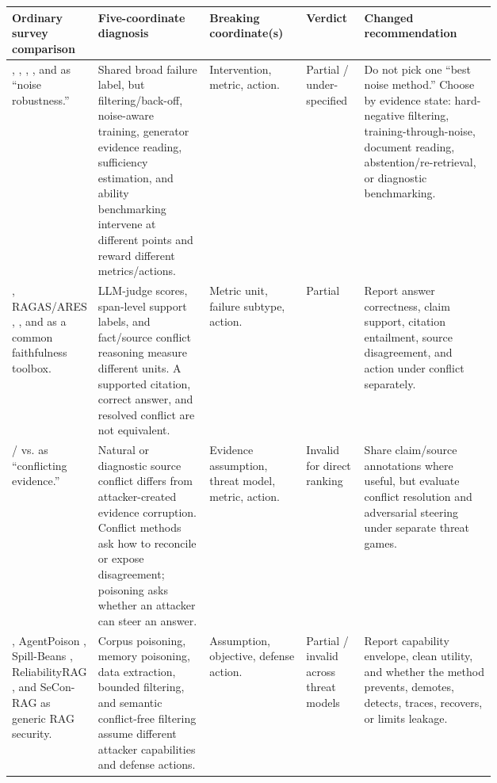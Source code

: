 \documentclass[11pt]{article}
\begin{document}


\begin{table}[t]
\centering
\tiny
\renewcommand{\arraystretch}{0.88}
\begin{tabularx}{\linewidth}{>{\raggedright\arraybackslash}p{0.16\linewidth}>{\raggedright\arraybackslash}p{0.23\linewidth}>{\raggedright\arraybackslash}p{0.20\linewidth}>{\raggedright\arraybackslash}p{0.12\linewidth}X}
\toprule
\textbf{Ordinary survey comparison} & \textbf{Five-coordinate diagnosis} & \textbf{Breaking coordinate(s)} & \textbf{Verdict} & \textbf{Changed recommendation} \\
\midrule
\citet{irrelevantContext2023}, \citet{raat2024}, \citet{chainOfNote2023}, \citet{sufficientContext2024}, and \citet{rgb2023} as ``noise robustness.'' & Shared broad failure label, but filtering/back-off, noise-aware training, generator evidence reading, sufficiency estimation, and ability benchmarking intervene at different points and reward different metrics/actions. & Intervention, metric, action. & Partial / under-specified & Do not pick one ``best noise method.'' Choose by evidence state: hard-negative filtering, training-through-noise, document reading, abstention/re-retrieval, or diagnostic benchmarking. \\
\citet{ragTruth2024}, RAGAS/ARES \citep{ragas2024,ares2024}, \citet{faithfulRAG2025}, and \citet{astuteRAG2025} as a common faithfulness toolbox. & LLM-judge scores, span-level support labels, and fact/source conflict reasoning measure different units. A supported citation, correct answer, and resolved conflict are not equivalent. & Metric unit, failure subtype, action. & Partial & Report answer correctness, claim support, citation entailment, source disagreement, and action under conflict separately. \\
\citet{faithfulRAG2025} / \citet{astuteRAG2025} vs. \citet{poisonedRAG2024} as ``conflicting evidence.'' & Natural or diagnostic source conflict differs from attacker-created evidence corruption. Conflict methods ask how to reconcile or expose disagreement; poisoning asks whether an attacker can steer an answer. & Evidence assumption, threat model, metric, action. & Invalid for direct ranking & Share claim/source annotations where useful, but evaluate conflict resolution and adversarial steering under separate threat games. \\
\citet{poisonedRAG2024}, AgentPoison \citep{rrag053}, Spill-Beans \citep{venue200SpillBeans}, ReliabilityRAG \citep{rrag021}, and SeCon-RAG \citep{rrag017} as generic RAG security. & Corpus poisoning, memory poisoning, data extraction, bounded filtering, and semantic conflict-free filtering assume different attacker capabilities and defense actions. & Assumption, objective, defense action. & Partial / invalid across threat models & Report capability envelope, clean utility, and whether the method prevents, demotes, detects, traces, recovers, or limits leakage. \\

\end{tabularx}
\end{table}
\end{document}

